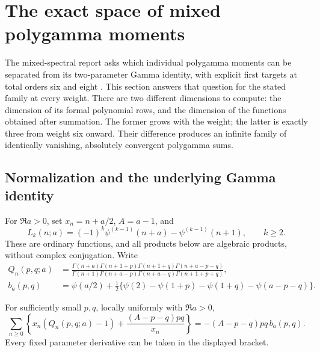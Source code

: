 \section{The exact space of mixed polygamma moments}
\label{sec:bell}

The mixed-spectral report asks which individual polygamma moments can
be separated from its two-parameter Gamma identity, with explicit first
targets at total orders six and eight \cite{RepoMixed}. This section
answers that question for the stated family at every weight. There are
two different dimensions to compute: the dimension of its formal
polynomial rows, and the dimension of the functions obtained after
summation. The former grows with the weight; the latter is exactly three
from weight six onward. Their difference produces an infinite family of
identically vanishing, absolutely convergent polygamma sums.

\subsection{Normalization and the underlying Gamma identity}

For $\Re a>0$, set $x_n=n+a/2$, $A=a-1$, and
\begin{equation}
 L_k(n;a)=(-1)^k\psi^{(k-1)}(n+a)-\psi^{(k-1)}(n+1),
 \qquad k\ge2.
 \label{bell:lambda}
\end{equation}
These are ordinary functions, and all products below are algebraic
products, without complex conjugation. Write
\begin{align}
 Q_n(p,q;a)
 &=\frac{\Gamma(n+a)\Gamma(n+1+p)\Gamma(n+1+q)
              \Gamma(n+a-p-q)}
 {\Gamma(n+1)\Gamma(n+a-p)\Gamma(n+a-q)
              \Gamma(n+1+p+q)},\label{bell:Q}\\
 b_a(p,q)
 &=\psi(a/2)+\tfrac12\{\psi(2)-\psi(1+p)-\psi(1+q)
                                      -\psi(a-p-q)\}.
 \label{bell:b}
\end{align}

\begin{lemma}
\label{bell:antecedent}
For sufficiently small $p,q$, locally uniformly with $\Re a>0$,
\begin{equation}
 \sum_{n\ge0}\left\{x_n(Q_n(p,q;a)-1)
             +\frac{(A-p-q)pq}{x_n}\right\}
             =-(A-p-q)pq\,b_a(p,q).
 \label{bell:master}
\end{equation}
Every fixed parameter derivative can be taken in the displayed bracket.
\end{lemma}

